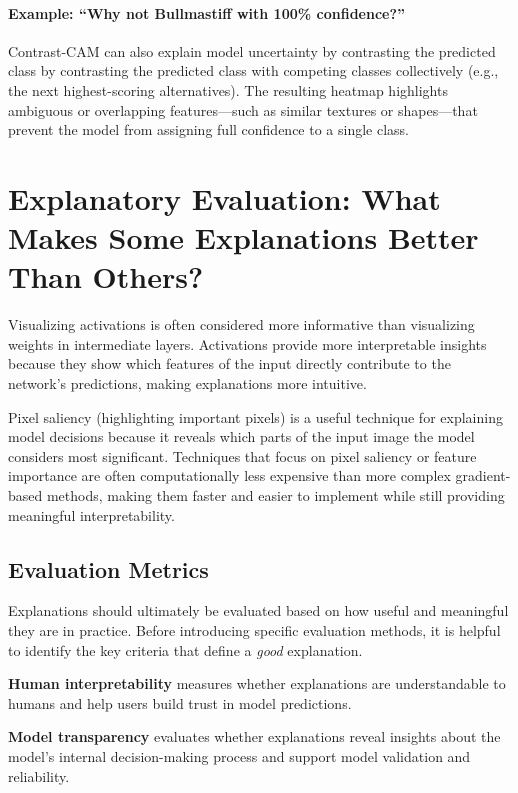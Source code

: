 \documentclass{article}
\begin{document}
\paragraph{Example: ``Why not Bullmastiff with 100\% confidence?''}
Contrast-CAM can also explain model uncertainty by contrasting the predicted class by contrasting the predicted class with competing classes collectively (e.g., the next highest-scoring alternatives).
The resulting heatmap highlights ambiguous or overlapping features—such as similar textures or shapes—that prevent the model from assigning full confidence to a single class.

\section{Explanatory Evaluation: What Makes Some Explanations Better Than Others?}

Visualizing activations is often considered more informative than visualizing weights in intermediate layers. Activations provide more interpretable insights because they show which features of the input directly contribute to the network’s predictions, making explanations more intuitive.

Pixel saliency (highlighting important pixels) is a useful technique for explaining model decisions because it reveals which parts of the input image the model considers most significant. Techniques that focus on pixel saliency or feature importance are often computationally less expensive than more complex gradient-based methods, making them faster and easier to implement while still providing meaningful interpretability.

\subsection{Evaluation Metrics}

Explanations should ultimately be evaluated based on how useful and meaningful they are in practice. Before introducing specific evaluation methods, it is helpful to identify the key criteria that define a \emph{good} explanation.

\textbf{Human interpretability} measures whether explanations are understandable to humans and help users build trust in model predictions.

\textbf{Model transparency} evaluates whether explanations reveal insights about the model’s internal decision-making process and support model validation and reliability.
\end{document}
